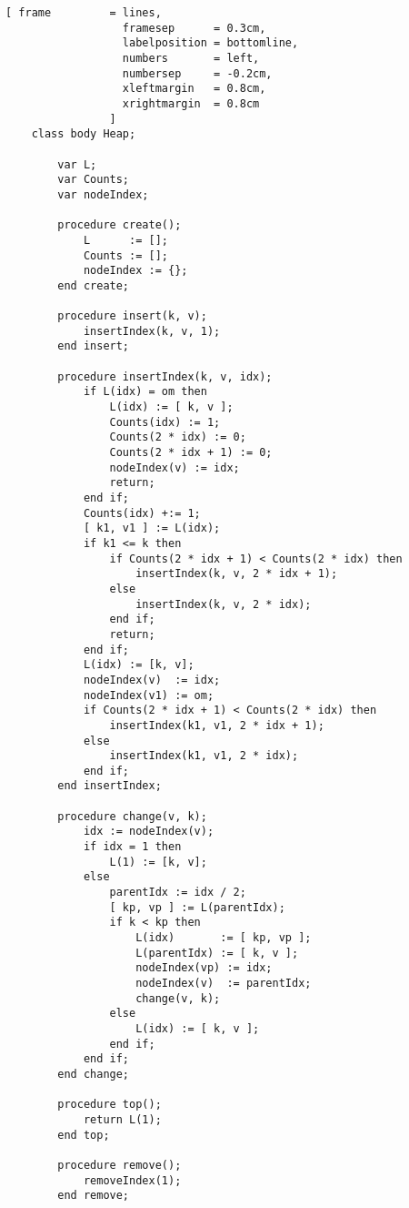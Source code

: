 \begin{Verbatim}[ frame         = lines, 
                  framesep      = 0.3cm, 
                  labelposition = bottomline,
                  numbers       = left,
                  numbersep     = -0.2cm,
                  xleftmargin   = 0.8cm,
                  xrightmargin  = 0.8cm
                ]
    class body Heap;
   
        var L;
        var Counts;
        var nodeIndex;
   
        procedure create();
            L      := [];
            Counts := [];
            nodeIndex := {};
        end create;
   
        procedure insert(k, v);
            insertIndex(k, v, 1);
        end insert;
   
        procedure insertIndex(k, v, idx);
            if L(idx) = om then
                L(idx) := [ k, v ];
                Counts(idx) := 1;
                Counts(2 * idx) := 0;
                Counts(2 * idx + 1) := 0;
                nodeIndex(v) := idx;
                return;
            end if;
            Counts(idx) +:= 1;
            [ k1, v1 ] := L(idx);
            if k1 <= k then
                if Counts(2 * idx + 1) < Counts(2 * idx) then
                    insertIndex(k, v, 2 * idx + 1);
                else 
                    insertIndex(k, v, 2 * idx);
                end if;
                return;
            end if;
            L(idx) := [k, v];
            nodeIndex(v)  := idx;
            nodeIndex(v1) := om;
            if Counts(2 * idx + 1) < Counts(2 * idx) then
                insertIndex(k1, v1, 2 * idx + 1);
            else
                insertIndex(k1, v1, 2 * idx);
            end if;
        end insertIndex;
   
        procedure change(v, k);
            idx := nodeIndex(v);
            if idx = 1 then
                L(1) := [k, v];
            else
                parentIdx := idx / 2;
                [ kp, vp ] := L(parentIdx);
                if k < kp then
                    L(idx)       := [ kp, vp ];
                    L(parentIdx) := [ k, v ];
                    nodeIndex(vp) := idx;
                    nodeIndex(v)  := parentIdx;
                    change(v, k);
                else 
                    L(idx) := [ k, v ];
                end if;
            end if;
        end change;
   
        procedure top();
            return L(1);
        end top;
   
        procedure remove();
            removeIndex(1);
        end remove;
   

\end{Verbatim}
